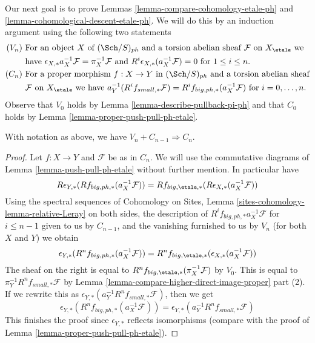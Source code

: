 \noindent
Our next goal is to prove Lemmas \ref{lemma-compare-cohomology-etale-ph} and
\ref{lemma-cohomological-descent-etale-ph}. We will do this by an induction
argument using the following two statements
\begin{align*}
(V_n) &
\text{ For an object }X
\text{ of }(\Sch/S)_{ph}
\text{ and a torsion abelian sheaf }\mathcal{F}
\text{ on }X_\etale
\text{ we}\\
&
\text{ have }\epsilon_{X, *}a_X^{-1}\mathcal{F} = \pi_X^{-1}\mathcal{F}
\text{ and }R^i\epsilon_{X, *}(a_X^{-1}\mathcal{F}) = 0
\text{ for }1 \leq i \leq n. \\
(C_n) &
\text{ For a proper morphism }f : X \to Y
\text{ in }(\Sch/S)_{ph}
\text{ and a torsion abelian sheaf}\\
&
\text{ }\mathcal{F}
\text{ on }X_\etale
\text{ we have }a_Y^{-1}(R^if_{small, *}\mathcal{F}) =
R^if_{big, ph, *}(a_X^{-1}\mathcal{F})
\text{ for }i = 0, \ldots, n.
\end{align*}
Observe that $V_0$ holds by Lemma \ref{lemma-describe-pullback-pi-ph}
and that $C_0$ holds by
Lemma \ref{lemma-proper-push-pull-ph-etale}.

\begin{lemma}
\label{lemma-V-implies-C-etale-ph}
With notation as above, we have $V_n + C_{n - 1} \Rightarrow C_n$.
\end{lemma}

\begin{proof}
Let $f : X \to Y$ and $\mathcal{F}$ be as in $C_n$.
We will use the commutative diagrams of
Lemma \ref{lemma-push-pull-ph-etale}
without further mention. In particular have
$$
R\epsilon_{Y, *}(Rf_{big, ph, *}(a_X^{-1}\mathcal{F})) =
Rf_{big, \etale, *}(R\epsilon_{X, *}(a_X^{-1}\mathcal{F}))
$$
Using the spectral sequences of
Cohomology on Sites, Lemma \ref{sites-cohomology-lemma-relative-Leray}
on both sides, the description of $R^if_{big, ph, *}a_X^{-1}\mathcal{F}$
for $i \leq n - 1$ given to us by $C_{n - 1}$, and
the vanishing furnished to us by $V_n$
(for both $X$ and $Y$) we obtain 
$$
\epsilon_{Y, *}(R^nf_{big, ph, *}(a_X^{-1}\mathcal{F})) =
R^nf_{big, \etale, *}(\epsilon_{X, *}(a_X^{-1}\mathcal{F}))
$$
The sheaf on the right is equal to
$R^nf_{big, \etale, *}(\pi_X^{-1}\mathcal{F})$ by $V_0$.
This is equal to
$\pi_Y^{-1} R^nf_{small, *}\mathcal{F}$
by Lemma \ref{lemma-compare-higher-direct-image-proper} part (2).
If we rewrite this as
$\epsilon_{Y, *}(a_Y^{-1}R^nf_{small, *}\mathcal{F})$, then we get
$$
\epsilon_{Y, *}(R^nf_{big, ph, *}(a_X^{-1}\mathcal{F})) =
\epsilon_{Y, *}(a_Y^{-1}R^nf_{small, *}\mathcal{F})
$$
This finishes the proof since $\epsilon_{Y, *}$ reflects
isomorphisms (compare with the
proof of Lemma \ref{lemma-proper-push-pull-ph-etale}).
\end{proof}

